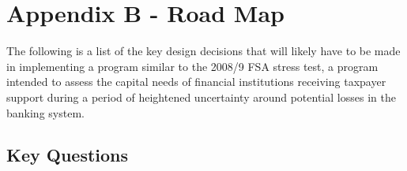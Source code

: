 \documentclass[12pt]{article}
\begin{document}
\section{Appendix B - Road Map}

The following is a list of the key design decisions that will likely have to be made in implementing a program similar to the 2008/9 FSA stress test, a program intended to assess the capital needs of financial institutions receiving taxpayer support during a period of heightened uncertainty around potential losses in the banking system.

\subsection{Key Questions}

\begin{outline}[enumerate]


\end{outline}
\end{document}

